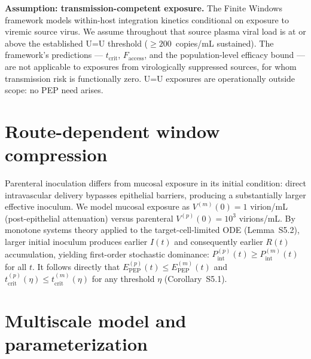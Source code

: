 \documentclass[10pt,letterpaper]{article}
\theoremstyle{definition}
\theoremstyle{remark}
\newcommand{\Pint}{P_{\text{int}}}
\newcommand{\Epep}{E_{\text{PEP}}}
\newcommand{\Faccess}{F_{\text{access}}}
\newcommand{\tcrit}{t_{\text{crit}}}
\begin{document}
\textbf{Assumption: transmission-competent exposure.} The Finite Windows framework models within-host integration kinetics conditional on exposure to viremic source virus. We assume throughout that source plasma viral load is at or above the established U=U threshold ($\geq 200$~copies/mL sustained). The framework's predictions --- $\tcrit$, $\Faccess$, and the population-level efficacy bound --- are not applicable to exposures from virologically suppressed sources, for whom transmission risk is functionally zero\cite{rodger2019,bavinton2018}. U=U exposures are operationally outside scope: no PEP need arises.

\section*{Route-dependent window compression}

Parenteral inoculation differs from mucosal exposure in its initial condition: direct intravascular delivery bypasses epithelial barriers, producing a substantially larger effective inoculum. We model mucosal exposure as $V^{(m)}(0) = 1$ virion/mL (post-epithelial attenuation) versus parenteral $V^{(p)}(0) = 10^{3}$ virions/mL. By monotone systems theory applied to the target-cell-limited ODE (Lemma~S5.2), larger initial inoculum produces earlier $I(t)$ and consequently earlier $R(t)$ accumulation, yielding first-order stochastic dominance: $\Pint^{(p)}(t) \geq \Pint^{(m)}(t)$ for all $t$. It follows directly that $\Epep^{(p)}(t) \leq \Epep^{(m)}(t)$ and $\tcrit^{(p)}(\eta) \leq \tcrit^{(m)}(\eta)$ for any threshold $\eta$ (Corollary~S5.1).

\section*{Multiscale model and parameterization}
\end{document}

